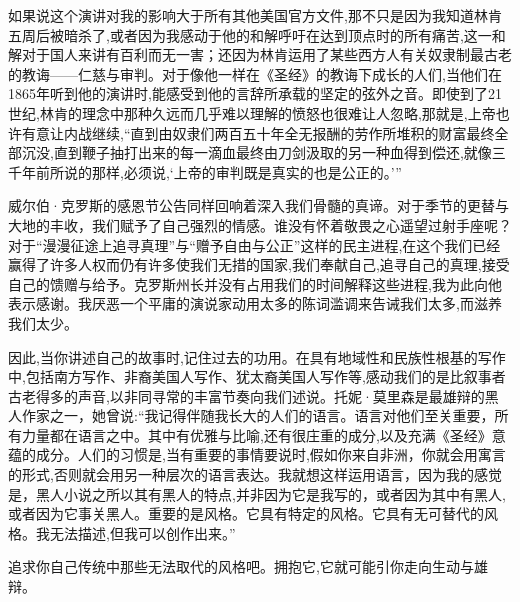 如果说这个演讲对我的影响大于所有其他美国官方文件,那不只是因为我知道林肯五周后被暗杀了,或者因为我感动于他的和解呼吁在达到顶点时的所有痛苦,这一和解对于国人来讲有百利而无一害；还因为林肯运用了某些西方人有关奴隶制最古老的教诲——仁慈与审判。对于像他一样在《圣经》的教诲下成长的人们,当他们在1865年听到他的演讲时,能感受到他的言辞所承载的坚定的弦外之音。即使到了21世纪,林肯的理念中那种久远而几乎难以理解的愤怒也很难让人忽略,那就是,上帝也许有意让内战继续,“直到由奴隶们两百五十年全无报酬的劳作所堆积的财富最终全部沉没,直到鞭子抽打出来的每一滴血最终由刀剑汲取的另一种血得到偿还,就像三千年前所说的那样,必须说,‘上帝的审判既是真实的也是公正的。’”

威尔伯·克罗斯的感恩节公告同样回响着深入我们骨髓的真谛。对于季节的更替与大地的丰收，我们赋予了自己强烈的情感。谁没有怀着敬畏之心遥望过射手座呢？对于“漫漫征途上追寻真理”与“赠予自由与公正”这样的民主进程,在这个我们已经赢得了许多人权而仍有许多使我们无措的国家,我们奉献自己,追寻自己的真理,接受自己的馈赠与给予。克罗斯州长并没有占用我们的时间解释这些进程,我为此向他表示感谢。我厌恶一个平庸的演说家动用太多的陈词滥调来告诫我们太多,而滋养我们太少。

因此,当你讲述自己的故事时,记住过去的功用。在具有地域性和民族性根基的写作中,包括南方写作、非裔美国人写作、犹太裔美国人写作等,感动我们的是比叙事者古老得多的声音,以非同寻常的丰富节奏向我们述说。托妮·莫里森是最雄辩的黑人作家之一，她曾说:“我记得伴随我长大的人们的语言。语言对他们至关重要，所有力量都在语言之中。其中有优雅与比喻,还有很庄重的成分,以及充满《圣经》意蕴的成分。人们的习惯是,当有重要的事情要说时,假如你来自非洲，你就会用寓言的形式,否则就会用另一种层次的语言表达。我就想这样运用语言，因为我的感觉是，黑人小说之所以其有黑人的特点,并非因为它是我写的，或者因为其中有黑人,或者因为它事关黑人。重要的是风格。它具有特定的风格。它具有无可替代的风格。我无法描述,但我可以创作出来。”

追求你自己传统中那些无法取代的风格吧。拥抱它,它就可能引你走向生动与雄辩。